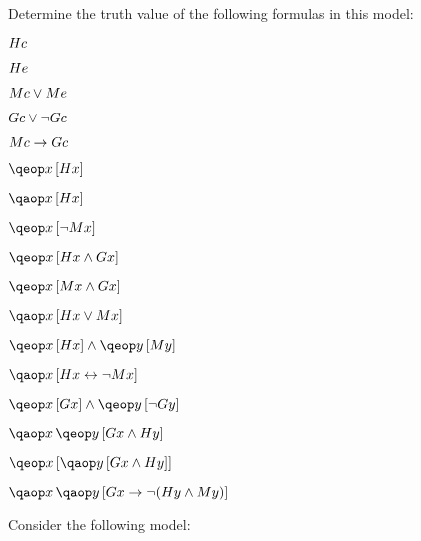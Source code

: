 \documentclass[PHIL101-Textbook.tex]{subfiles}
\begin{document}
Determine the truth value of the following formulas in this model:
\begin{earg}
\item $\mathord{H}{c} $
\item $\mathord{H}{e} $
\item $\mathord{M}{c}  \vee \mathord{M}{e}$
\item $\mathord{G}{c}  \vee \neg \mathord{G}{c}$
\item $\mathord{M}{c}  \rightarrow \mathord{G}{c}$
\item $\qeb{x}{\atom{H}{x}}$
\item $\qab{x}{\atom{H}{x}}$
\item $\qeb{x}{\enot \atom{M}{x}}$
\item $\qeb{x}{\atom{H}{x} \eand \atom{G}{x}}$
\item $\qeb{x}{\atom{M}{x} \eand \atom{G}{x}}$
\item $\qab{x}{\atom{H}{x} \eor \atom{M}{x}}$
\item $\qeb{x}{\atom Hx} \eand \qeb{y}{\atom M y}$
\item $\qab{x}{\atom{H}{x} \eiff \enot \atom{M}{x}}$
\item $\qeb{x}{\atom Gx} \eand \qeb{y}{\enot \atom G y}$
\item $\qa{x}{\qeb{y}{\atom{G}{x} \eand \atom{H}{y}}}$
\item $\qeb{x}{\qab{y}{\atom G x \eand \atom H y}}$
\item $\qa{x}{\qab{y}{\atom Gx \eif \enot (\atom Hy \land \atom M y)}}$
\end{earg}

\noindent\problempart
\label{pr.TorF3}
Consider the following model:	
\end{document}
